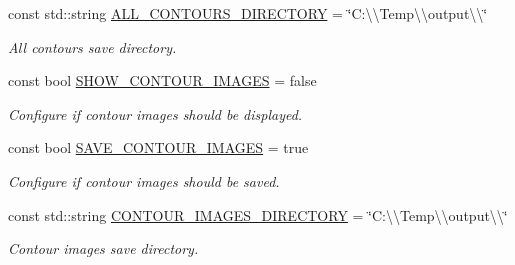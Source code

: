 \begin{DoxyCompactItemize}
const std\+::string \mbox{\hyperlink{namespacedto_1_1_configuration_ad48e9706dbe047808571b1696dab6e10}{A\+L\+L\+\_\+\+C\+O\+N\+T\+O\+U\+R\+S\+\_\+\+D\+I\+R\+E\+C\+T\+O\+RY}} = \char`\"{}C\+:\textbackslash{}\textbackslash{}\+Temp\textbackslash{}\textbackslash{}output\textbackslash{}\textbackslash{}\char`\"{}
\begin{DoxyCompactList}\small\item\em All contours save directory. \end{DoxyCompactList}\item 
\mbox{\label{namespacedto_1_1_configuration_a3dfbc3aebf3d5a76f07a1583e0d32e07}} 
const bool \mbox{\hyperlink{namespacedto_1_1_configuration_a3dfbc3aebf3d5a76f07a1583e0d32e07}{S\+H\+O\+W\+\_\+\+C\+O\+N\+T\+O\+U\+R\+\_\+\+I\+M\+A\+G\+ES}} = false
\begin{DoxyCompactList}\small\item\em Configure if contour images should be displayed. \end{DoxyCompactList}\item 
\mbox{\label{namespacedto_1_1_configuration_acc82b377d85fdeadcce4e4686a5ecf56}} 
const bool \mbox{\hyperlink{namespacedto_1_1_configuration_acc82b377d85fdeadcce4e4686a5ecf56}{S\+A\+V\+E\+\_\+\+C\+O\+N\+T\+O\+U\+R\+\_\+\+I\+M\+A\+G\+ES}} = true
\begin{DoxyCompactList}\small\item\em Configure if contour images should be saved. \end{DoxyCompactList}\item 
\mbox{\label{namespacedto_1_1_configuration_ac019e74c8562fa9916f5b756cab74fdc}} 
const std\+::string \mbox{\hyperlink{namespacedto_1_1_configuration_ac019e74c8562fa9916f5b756cab74fdc}{C\+O\+N\+T\+O\+U\+R\+\_\+\+I\+M\+A\+G\+E\+S\+\_\+\+D\+I\+R\+E\+C\+T\+O\+RY}} = \char`\"{}C\+:\textbackslash{}\textbackslash{}\+Temp\textbackslash{}\textbackslash{}output\textbackslash{}\textbackslash{}\char`\"{}
\begin{DoxyCompactList}\small\item\em Contour images save directory. \end{DoxyCompactList}\item 
\mbox{\label{namespacedto_1_1_configuration_aa353e5faa821d1815da2e972a913897e}} 

\end{DoxyCompactItemize}
